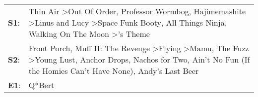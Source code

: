 \begin{supertabular}{p{0.03\textwidth}p{0.92\textwidth}}
 \textbf{S1}:  &                                       Thin Air\textsuperscript{} \textgreater \enspace Out Of Order\textsuperscript{}, \enspace Professor Wormbog\textsuperscript{}, \enspace Hajimemashite\textsuperscript{} \textgreater \enspace Linus and Lucy\textsuperscript{} \textgreater \enspace Space Funk Booty\textsuperscript{}, \enspace All Things Ninja\textsuperscript{}, \enspace Walking On The Moon\textsuperscript{} \textgreater {}'s Theme\textsuperscript{}  \enspace  \\
 \textbf{S2}:  &  Front Porch\textsuperscript{}, \enspace Muff II: The Revenge\textsuperscript{} \textgreater \enspace Flying\textsuperscript{} \textgreater \enspace Mamu\textsuperscript{}, \enspace The Fuzz\textsuperscript{} \textgreater \enspace Young Lust\textsuperscript{}, \enspace Anchor Drops\textsuperscript{}, \enspace Nachos for Two\textsuperscript{}, \enspace Ain't No Fun (If the Homies Can't Have None)\textsuperscript{}, \enspace Andy's Last Beer\textsuperscript{}  \enspace  \\
 \textbf{E1}:  &                                                                                                                                                                                                                                                                                                                                                                                                                                                      Q*Bert\textsuperscript{}  \enspace  \\
\end{supertabular}
